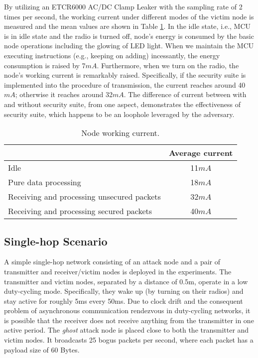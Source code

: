 \documentclass[10pt,journal,cspaper,compsoc]{IEEEtran}
\begin{document}
By utilizing an ETCR6000 AC/DC Clamp Leaker with the sampling rate of 2 times per second, the working current under different modes of the victim node is measured and the mean values are shown in Table \ref{workingcurrent}. In the idle state, i.e., MCU is in idle state and the radio is turned off, node's energy is consumed by the basic node operations including the glowing of LED light. When we maintain the MCU executing instructions (e.g., keeping on adding) incessantly, the energy consumption is raised by 7$mA$. Furthermore, when we turn on the radio, the node's working current is remarkably raised. Specifically, if the security suite is implemented into the procedure of transmission, the current reaches around 40$mA$; otherwise it reaches around 32$mA$. The difference of current between with and without security suite, from one aspect, demonstrates the effectiveness of security suite, which happens to be an loophole leveraged by the adversary.


\renewcommand\arraystretch{1.35}
\begin{table}[ht]
\scriptsize
\caption{Node working current.}
\vspace{-4mm}
\center
\begin{tabular}{>{\centering\arraybackslash}m{5.2cm}|c}
\toprule
{\bf Working mode} & {\bf Average current}\\
\hline
Idle & 11$mA$\\
Pure data processing  & 18$mA$\\
Receiving and processing unsecured packets & 32$mA$\\
Receiving and processing secured packets & 40$mA$\\
\bottomrule
\end{tabular}\label{workingcurrent}
\end{table}


\subsection{Single-hop Scenario}
A simple single-hop network consisting of an attack node and a pair of transmitter and receiver/victim nodes is deployed in the experiments. The transmitter and victim nodes, separated by a distance of 0.5m, operate in a low duty-cycling mode. Specifically, they wake up (by turning on their radios) and stay active for roughly 5ms every 50ms. Due to clock drift and the consequent problem of asynchronous communication rendezvous in duty-cycling networks, it is possible that the receiver does not receive anything from the transmitter in one active period. The {\em ghost} attack node is placed close to both the transmitter and victim nodes. It broadcasts 25 bogus packets per second, where each packet has a payload size of 60 Bytes.
\end{document}

